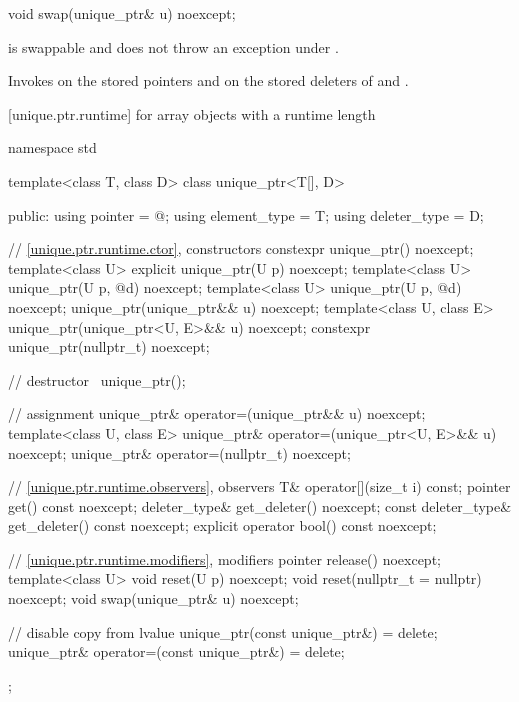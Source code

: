 \begin{indexed}{}
\begin{itemdecl}
void swap(unique_ptr& u) noexcept;
\end{itemdecl}
\end{indexed}

\begin{itemdescr}
\pnum
\expects
{} is swappable and
does not throw an exception under .

\pnum
\effects
Invokes  on the stored pointers and on the stored
deleters of  and .
\end{itemdescr}

[unique.ptr.runtime]{ for array objects with a runtime length}

%
\begin{codeblock}
namespace std {
  template<class T, class D> class unique_ptr<T[], D> {
  public:
    using pointer      = @\seebelow@;
    using element_type = T;
    using deleter_type = D;

    // \ref{unique.ptr.runtime.ctor}, constructors
    constexpr unique_ptr() noexcept;
    template<class U> explicit unique_ptr(U p) noexcept;
    template<class U> unique_ptr(U p, @\seebelow@ d) noexcept;
    template<class U> unique_ptr(U p, @\seebelow@ d) noexcept;
    unique_ptr(unique_ptr&& u) noexcept;
    template<class U, class E>
      unique_ptr(unique_ptr<U, E>&& u) noexcept;
    constexpr unique_ptr(nullptr_t) noexcept;

    // destructor
    ~unique_ptr();

    // assignment
    unique_ptr& operator=(unique_ptr&& u) noexcept;
    template<class U, class E>
      unique_ptr& operator=(unique_ptr<U, E>&& u) noexcept;
    unique_ptr& operator=(nullptr_t) noexcept;

    // \ref{unique.ptr.runtime.observers}, observers
    T& operator[](size_t i) const;
    pointer get() const noexcept;
    deleter_type& get_deleter() noexcept;
    const deleter_type& get_deleter() const noexcept;
    explicit operator bool() const noexcept;

    // \ref{unique.ptr.runtime.modifiers}, modifiers
    pointer release() noexcept;
    template<class U> void reset(U p) noexcept;
    void reset(nullptr_t = nullptr) noexcept;
    void swap(unique_ptr& u) noexcept;

    // disable copy from lvalue
    unique_ptr(const unique_ptr&) = delete;
    unique_ptr& operator=(const unique_ptr&) = delete;
  };
}
\end{codeblock}

